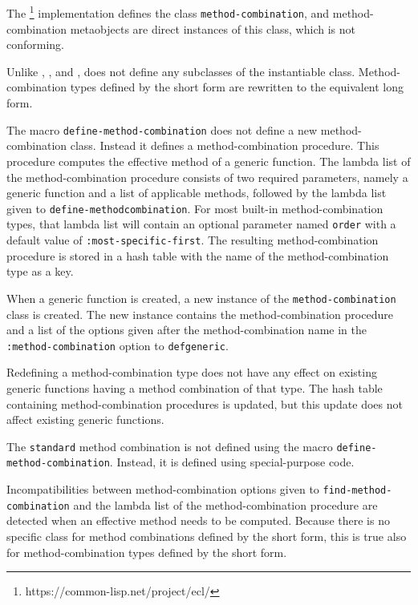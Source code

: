 \subsection{\ecl{}}
\label{sec-ecl}

The \ecl{}%
\footnote{https://common-lisp.net/project/ecl/}
\commonlisp{} implementation defines the class
\texttt{method-combination}, and method-combination metaobjects are
direct instances of this class, which is not conforming.

Unlike \pcl{}, \sbcl{}, and \ccl{}, \ecl{} does not define any
subclasses of the instantiable class.  Method-combination types
defined by the short form are rewritten to the equivalent long form.

The macro \texttt{define-method-combination} does not define a new
method-combination class.  Instead it defines a method-combination
procedure.  This procedure computes the effective method of a generic
function.  The lambda list of the method-combination procedure
consists of two required parameters, namely a generic function and a
list of applicable methods, followed by the lambda list given to
\texttt{define-method\-combination}.  For most built-in
method-combination types, that lambda list will contain an optional
parameter named \texttt{order} with a default value of
\texttt{:most-specific-first}.  The resulting method-combination
procedure is stored in a hash table with the name of the
method-combination type as a key.

When a generic function is created, a new instance of the
\texttt{method-combination} class is created.  The new instance
contains the method-combination procedure and a list of the options
given after the method-combination name in the
\texttt{:method-combination} option to \texttt{defgeneric}.

Redefining a method-combination type does not have any effect on
existing generic functions having a method combination of that type.
The hash table containing method-combination procedures is updated,
but this update does not affect existing generic functions.

The \texttt{standard} method combination is not defined using the
macro \texttt{define-method-combination}.  Instead, it is defined
using special-purpose code.

Incompatibilities between method-combination options given to
\texttt{find-method-combination} and the lambda list of the
method-combination procedure are detected when an effective method
needs to be computed.  Because there is no specific class for method
combinations defined by the short form, this is true also for
method-combination types defined by the short form.

